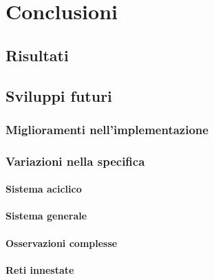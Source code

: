 \chapter{Conclusioni}
\section{Risultati}

\section{Sviluppi futuri}
\subsection{Miglioramenti nell'implementazione}

\subsection{Variazioni nella specifica}
\subsubsection{Sistema aciclico}

\subsubsection{Sistema generale}

\subsubsection{Osservazioni complesse}

\subsubsection{Reti innestate}